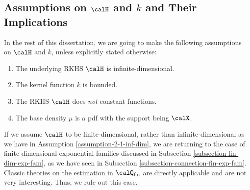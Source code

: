 \documentclass[12pt]{article}
\theoremstyle{definition}
\theoremstyle{theorem}
\theoremstyle{remark}
\begin{document}
%
%	


\subsection{Assumptions on $\calH$ and $k$ and Their Implications}

In the rest of this dissertation, we are going to make the following assumptions on $\calH$ and $k$, unless explicitly stated otherwise: 
\begin{enumerate}[label=\textbf{(\arabic*)}]
	\item \label{assumption-2-1-inf-dim} The underlying RKHS $\calH$ is infinite-dimensional. 
	\item \label{assumption-2-2-bdd-kernel} The kernel function $k$ is bounded. 
	\item \label{assumption-2-3-no-const-fun} The RKHS $\calH$ does \emph{not} constant functions. 
	\item \label{assumption-2-4-base-density} The base density $\mu$ is a pdf with the support being $\calX$. 
\end{enumerate}

If we assume $\calH$ to be finite-dimensional, rather than infinite-dimensional as we have in Assumption \ref{assumption-2-1-inf-dim}, we are returning to the case of finite-dimensional exponential families discussed in Subsection \ref{subsection-fin-dim-exp-fam}, as we have seen in Subsection \ref{subsection-connection-fin-exp-fam}. Classic theories on the estimation in $\calQ_{\mathrm{fin}}$ are directly applicable and are not very interesting. Thus, we rule out this case. 
\end{document}
